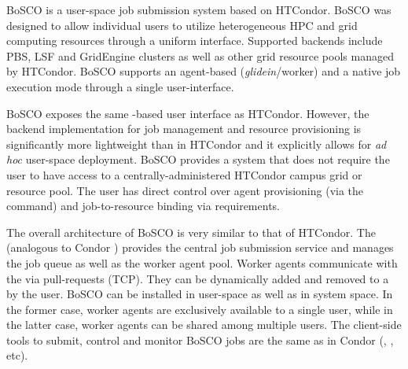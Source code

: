 \documentclass{sig-alternate}
\begin{document}

BoSCO is a user-space job submission system based on HTCondor. BoSCO was
designed to allow individual users to utilize heterogeneous HPC and grid
computing resources through a uniform interface. Supported backends include
PBS, LSF and GridEngine clusters as well as other grid resource pools managed
by HTCondor. BoSCO supports an agent-based (\textit{glidein}/worker) and a
native job execution mode through a single user-interface.

BoSCO exposes the same -based user interface as HTCondor.
However, the backend implementation for job management and resource
provisioning is significantly more lightweight than in HTCondor and it
explicitly allows for \textit{ad hoc} user-space deployment. BoSCO provides a
\pilot system that does not require the user to have access to a
centrally-administered HTCondor campus grid or resource pool. The user has
direct control over \pilot agent provisioning (via the 
command) and job-to-resource binding via  requirements.

The overall architecture of BoSCO is very similar to that of HTCondor. The
 (analogous to Condor ) provides the
central job submission service and manages the job queue as well as the worker
agent pool. Worker agents communicate with the  via
pull-requests (TCP). They can be dynamically added and removed to a
 by the user. BoSCO can be installed in user-space
as well as in system space. In the former case, worker agents are exclusively
available to a single user, while in the latter case, worker agents can be
shared among multiple users. The client-side tools to submit, control and
monitor BoSCO jobs are the same as in Condor (,
, etc).
\end{document}

